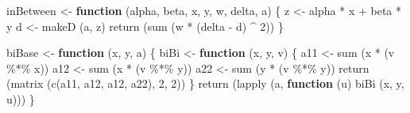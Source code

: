 \documentclass[
  12pt,
  letterpaper,
  DIV=11,
  numbers=noendperiod]{scrreprt}
\newenvironment{Shaded}{\begin{snugshade}}{\end{snugshade}}
\newcommand{\ControlFlowTok}[1]{\textcolor[rgb]{0.00,0.23,0.31}{\textbf{#1}}}
\newcommand{\DecValTok}[1]{\textcolor[rgb]{0.68,0.00,0.00}{#1}}
\newcommand{\FunctionTok}[1]{\textcolor[rgb]{0.28,0.35,0.67}{#1}}
\newcommand{\NormalTok}[1]{\textcolor[rgb]{0.00,0.23,0.31}{#1}}
\newcommand{\OtherTok}[1]{\textcolor[rgb]{0.00,0.23,0.31}{#1}}
\newcommand{\SpecialCharTok}[1]{\textcolor[rgb]{0.37,0.37,0.37}{#1}}
\theoremstyle{remark}
\begin{document}
\begin{Shaded}
\begin{Highlighting}[]
\NormalTok{inBetween }\OtherTok{\textless{}{-}} \ControlFlowTok{function}\NormalTok{ (alpha, beta, x, y, w, delta, a) \{}
\NormalTok{  z }\OtherTok{\textless{}{-}}\NormalTok{ alpha }\SpecialCharTok{*}\NormalTok{ x }\SpecialCharTok{+}\NormalTok{ beta }\SpecialCharTok{*}\NormalTok{ y}
\NormalTok{  d }\OtherTok{\textless{}{-}} \FunctionTok{makeD}\NormalTok{ (a, z)}
  \FunctionTok{return}\NormalTok{ (}\FunctionTok{sum}\NormalTok{ (w }\SpecialCharTok{*}\NormalTok{ (delta }\SpecialCharTok{{-}}\NormalTok{ d) }\SpecialCharTok{\^{}} \DecValTok{2}\NormalTok{))}
\NormalTok{\}}

\NormalTok{biBase }\OtherTok{\textless{}{-}} \ControlFlowTok{function}\NormalTok{ (x, y, a) \{}
\NormalTok{  biBi }\OtherTok{\textless{}{-}} \ControlFlowTok{function}\NormalTok{ (x, y, v) \{}
\NormalTok{    a11 }\OtherTok{\textless{}{-}} \FunctionTok{sum}\NormalTok{ (x }\SpecialCharTok{*}\NormalTok{ (v }\SpecialCharTok{\%*\%}\NormalTok{ x))}
\NormalTok{    a12 }\OtherTok{\textless{}{-}} \FunctionTok{sum}\NormalTok{ (x }\SpecialCharTok{*}\NormalTok{ (v }\SpecialCharTok{\%*\%}\NormalTok{ y))}
\NormalTok{    a22 }\OtherTok{\textless{}{-}} \FunctionTok{sum}\NormalTok{ (y }\SpecialCharTok{*}\NormalTok{ (v }\SpecialCharTok{\%*\%}\NormalTok{ y))}
    \FunctionTok{return}\NormalTok{ (}\FunctionTok{matrix}\NormalTok{ (}\FunctionTok{c}\NormalTok{(a11, a12, a12, a22), }\DecValTok{2}\NormalTok{, }\DecValTok{2}\NormalTok{))}
\NormalTok{  \}}
  \FunctionTok{return}\NormalTok{ (}\FunctionTok{lapply}\NormalTok{ (a, }\ControlFlowTok{function}\NormalTok{ (u)}
    \FunctionTok{biBi}\NormalTok{ (x, y, u)))}
\NormalTok{\}}


\end{Highlighting}
\end{Shaded}
\end{document}

